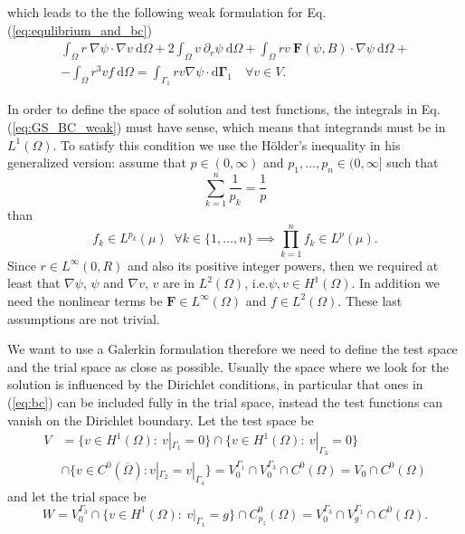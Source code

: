 which leads to the the following weak formulation for Eq.(\ref{eq:equlibrium_and_bc})
\begin{equation}\label{eq:GS_BC_weak}
  \begin{split}
    \int_\Omega r\:\nabla\psi \cdot\nabla v\:\mathrm{d}\Omega+2\int_\Omega v\:\partial_r \psi\:\mathrm{d}\Omega+\int_\Omega rv\:\mathbf{F}(\psi,B)\cdot\nabla\psi\:\mathrm{d}\Omega +\\ -\int_\Omega r^3vf\:\mathrm{d}\Omega =\int_{\Gamma_1} rv\nabla \psi\cdot\mathrm{d}\mathbf{\Gamma}_1\quad\forall v\in V.
  \end{split}
\end{equation}
\medskip

In order to define the space of solution and test functions, the integrals in Eq.(\ref{eq:GS_BC_weak}) must have sense, which means that integrands must be in $L^1(\Omega)$. To satisfy this condition we use the H\"{o}lder's inequality in his generalized version: assume that $p\in(0, \infty)$ and $p_1,\dots, p_n  \in (0, \infty]$ such that
\begin{equation}
  \sum_{k=1}^n \frac1{p_k}=\frac{1}{p}
\end{equation}
than
\begin{equation}
  f_k\in L^{p_k}(\mu)\;\;\forall k\in\{1,\ldots,n\}\implies\prod_{k=1}^n f_k \in L^p(\mu).
\end{equation}
Since $r\in L^\infty(0,R)$ and also its positive integer powers, then we required at least that $\nabla \psi$, $\psi$ and $\nabla v$, $v$ are in $L^2(\Omega)$,
i.e.$\psi,v\in H^1(\Omega)$. In addition we need the nonlinear terms be $\mathbf{F}\in L^\infty(\Omega)$ and $f\in L^2(\Omega)$. These last assumptions are not trivial.
\medskip

We want to use a Galerkin formulation therefore we need to define the test space and the trial space as close as possible. Usually the space where we look for the solution is influenced by the Dirichlet conditions, in particular that ones in (\ref{eq:bc}) can be included fully in the trial space, instead the test functions can vanish on the Dirichlet boundary. Let the test space be
\begin{equation}\label{eq:test_space}
\begin{split}
 V&=\{v\in H^1(\Omega):\:v|_{\Gamma_1}=0\}\cap\{v\in H^1(\Omega):\:v|_{\Gamma_3}=0 \}\\
&\cap\{v\in C^0(\overline{\Omega}):v|_{\Gamma_2}=v|_{\Gamma_4}\}=V_0^{\Gamma_1}\cap V_0^{\Gamma_3} \cap C^0(\Omega)=V_0 \cap C^0(\Omega)
\end{split}
\end{equation}
and let the trial space be
\begin{equation}\label{eq:trial_space}
 W=V_0^{\Gamma_3}\cap\{v\in H^1(\Omega):\:v|_{\Gamma_1}=g \}\cap C^0_{p_z}(\Omega)=V_0^{\Gamma_3}\cap V_g^{\Gamma_1}\cap C^0(\Omega).
\end{equation}

